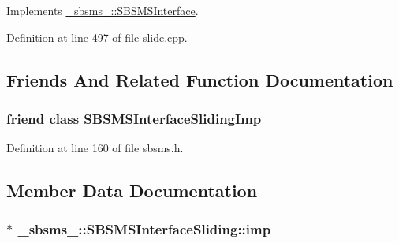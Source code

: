 Implements \hyperlink{class__sbsms___1_1_s_b_s_m_s_interface_a748ffe74692f9ac13d09a2611003341f}{\+\_\+sbsms\+\_\+\+::\+S\+B\+S\+M\+S\+Interface}.



Definition at line 497 of file slide.\+cpp.



\subsection{Friends And Related Function Documentation}
\subsubsection[{\texorpdfstring{S\+B\+S\+M\+S\+Interface\+Sliding\+Imp}{SBSMSInterfaceSlidingImp}}]{\setlength{\rightskip}{0pt plus 5cm}friend class {\bf S\+B\+S\+M\+S\+Interface\+Sliding\+Imp}\hspace{0.3cm}{\ttfamily [friend]}}\hypertarget{class__sbsms___1_1_s_b_s_m_s_interface_sliding_adc230bd4d7aa322e1eebabb120efc68c}{}\label{class__sbsms___1_1_s_b_s_m_s_interface_sliding_adc230bd4d7aa322e1eebabb120efc68c}


Definition at line 160 of file sbsms.\+h.



\subsection{Member Data Documentation}
\subsubsection[{\texorpdfstring{imp}{imp}}]{$\ast$ \+\_\+sbsms\+\_\+\+::\+S\+B\+S\+M\+S\+Interface\+Sliding\+::imp\hspace{0.3cm}{\ttfamily [protected]}}\hypertarget{class__sbsms___1_1_s_b_s_m_s_interface_sliding_aad311527b2799d6a0ea68e13680fe89c}{}\label{class__sbsms___1_1_s_b_s_m_s_interface_sliding_aad311527b2799d6a0ea68e13680fe89c}


